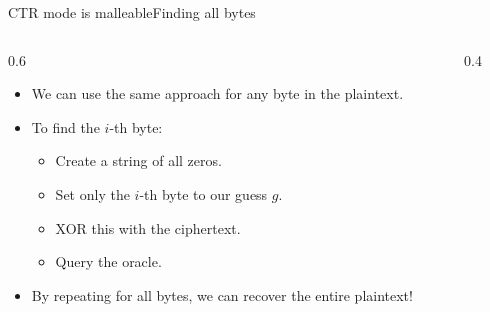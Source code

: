 \ifdefined\PRESENTATION\else\PassOptionsToClass{handout}{beamer}\fi\documentclass[aspectratio=169, lualatex]{beamer}
\begin{document}
\begin{frame}{CTR mode is malleable}{Finding all bytes}
	\begin{columns}[c]
		\begin{column}{0.6\textwidth}
			\begin{itemize}
				\item We can use the same approach for any byte in the plaintext.
				\item To find the $i$-th byte:
				      \begin{itemize}
					      \item Create a string of all zeros.
					      \item Set only the $i$-th byte to our guess $g$.
					      \item XOR this with the ciphertext.
					      \item Query the oracle.
				      \end{itemize}
				\item By repeating for all bytes, we can recover the entire plaintext!
			\end{itemize}
		\end{column}
		\begin{column}{0.4\textwidth}
		\end{column}
	\end{columns}
\end{frame}
\end{document}

